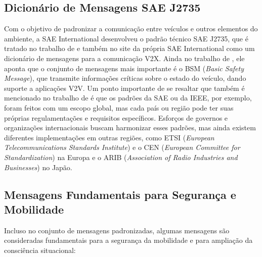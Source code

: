 \subsection{Dicionário de Mensagens SAE J2735}

Com o objetivo de padronizar a comunicação entre veículos e outros elementos do ambiente, a SAE International desenvolveu o
padrão técnico SAE J2735, que é tratado no trabalho de \cite{ref:kenney2011} e também no site da própria SAE International
\cite{ref:sae_j2735} como um dicionário de mensagens para a comunicação V2X. Ainda no trabalho de \cite{ref:kenney2011}, ele
aponta que o conjunto de mensagens mais importante é o BSM (\textit{Basic Safety Message}), que transmite informações críticas
sobre o estado do veículo, dando suporte a aplicações V2V.
Um ponto importante de se resaltar que também é mencionado no trabalho de \cite{ref:kenney2011} é que os padrões da SAE ou da
IEEE, por exemplo, foram feitos com um escopo global, mas cada país ou região pode ter suas próprias regulamentações e
requisitos específicos. Esforços de governos e organizações internacionais buscam harmonizar esses padrões, mas ainda existem
diferentes implementações em outras regiões, como ETSI (\textit{European Telecommunications Standards Institute}) e o CEN
(\textit{European Committee for Standardization}) na Europa e o ARIB (\textit{Association of Radio Industries and Businesses})
no Japão.

\subsection{Mensagens Fundamentais para Segurança e Mobilidade}

Incluso no conjunto de mensagens padronizadas, algumas mensagens são consideradas fundamentais para a segurança da mobilidade
e para ampliação da consciência situacional:


